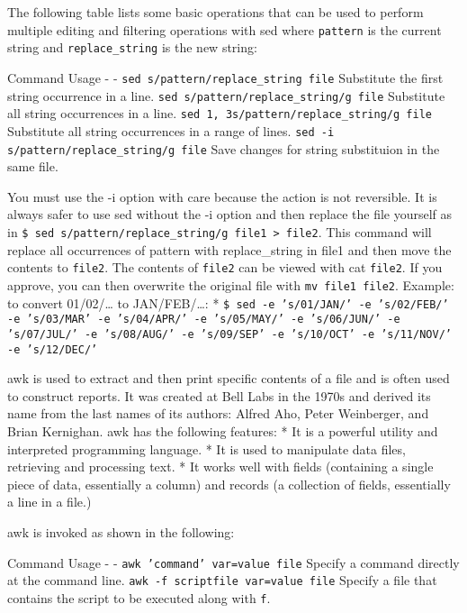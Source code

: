 The following table lists some basic operations that can be used to
perform multiple editing and filtering operations with sed where
\texttt{pattern} is the current string and \texttt{replace\_string} is
the new string:

Command \textbar{} Usage - \textbar{} -
\texttt{sed s/pattern/replace\_string file} \textbar{} Substitute the
first string occurrence in a line.
\texttt{sed s/pattern/replace\_string/g file} \textbar{} Substitute all
string occurrences in a line.
\texttt{sed 1, 3s/pattern/replace\_string/g file} \textbar{} Substitute
all string occurrences in a range of lines.
\texttt{sed -i s/pattern/replace\_string/g file} \textbar{} Save changes
for string substituion in the same file.

You must use the -i option with care because the action is not
reversible. It is always safer to use sed without the -i option and then
replace the file yourself as in
\texttt{\$ sed s/pattern/replace\_string/g file1 \textgreater{} file2}.
This command will replace all occurrences of pattern with
replace\_string in file1 and then move the contents to \texttt{file2}.
The contents of \texttt{file2} can be viewed with cat \texttt{file2}. If
you approve, you can then overwrite the original file with
\texttt{mv file1 file2}. Example: to convert 01/02/\ldots{} to
JAN/FEB/\ldots{}: *
\texttt{\$ sed -e 's/01/JAN/' -e 's/02/FEB/' -e 's/03/MAR' -e 's/04/APR/' -e 's/05/MAY/' -e 's/06/JUN/' -e 's/07/JUL/' -e 's/08/AUG/' -e 's/09/SEP' -e 's/10/OCT' -e 's/11/NOV/' -e 's/12/DEC/'}

awk is used to extract and then print specific contents of a file and is
often used to construct reports. It was created at Bell Labs in the
1970s and derived its name from the last names of its authors: Alfred
Aho, Peter Weinberger, and Brian Kernighan. awk has the following
features: * It is a powerful utility and interpreted programming
language. * It is used to manipulate data files, retrieving and
processing text. * It works well with fields (containing a single piece
of data, essentially a column) and records (a collection of fields,
essentially a line in a file.)

awk is invoked as shown in the following:

Command \textbar{} Usage - \textbar{} -
\texttt{awk 'command' var=value file} \textbar{} Specify a command
directly at the command line. \texttt{awk -f scriptfile var=value file}
\textbar{} Specify a file that contains the script to be executed along
with \texttt{f}.

